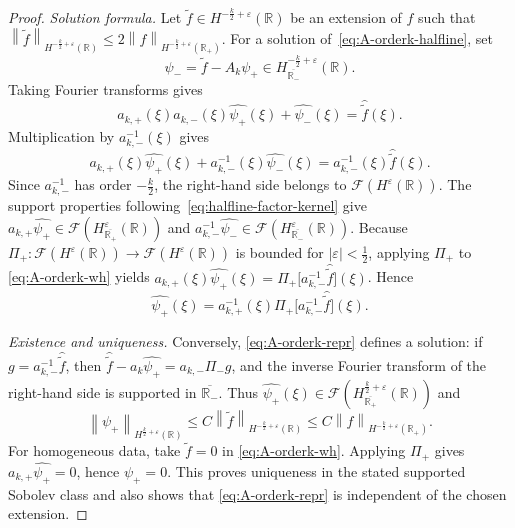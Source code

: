 \documentclass[11pt,reqno]{amsart}
\theoremstyle{plain}
\theoremstyle{definition}
\numberwithin{equation}{section}
\newcommand{\wh}[1]{\widehat{#1}}
\newcommand{\wt}[1]{\widetilde{#1}}
\newcommand{\norm}[1]{\left\lVert #1 \right\rVert}
\newcommand{\R}{\mathbb{R}}
\begin{document}
\begin{proof}
\emph{Solution formula.}
Let $\wt f\in H^{-\frac{k}{2}+\varepsilon}(\R)$ be an extension of $f$ such that
$\norm{\wt f}_{H^{-\frac{k}{2}+\varepsilon}(\R)}
\le 2 \norm{f}_{H^{-\frac{k}{2}+\varepsilon}(\R_+)}$.
For a solution of~\eqref{eq:A-orderk-halfline}, set
\begin{equation}
    \psi_-=\wt f-A_k\psi_+
    \in H^{-\frac{k}{2}+\varepsilon}_{\overline{\R_-}}(\R).
\end{equation}
Taking Fourier transforms gives
\begin{equation}
    a_{k,+}(\xi)a_{k,-}(\xi)\wh{\psi_+}(\xi) + \wh{\psi_-}(\xi)
    = \wh{\wt f}(\xi).
\end{equation}
Multiplication by $a_{k,-}^{-1}(\xi)$ gives
\begin{equation}\label{eq:A-orderk-wh}
    a_{k,+}(\xi)\wh{\psi_+}(\xi)
    + a_{k,-}^{-1}(\xi)\wh{\psi_-}(\xi)
    = a_{k,-}^{-1}(\xi)\wh{\wt f}(\xi).
\end{equation}
Since $a_{k,-}^{-1}$ has order $-\frac{k}{2}$, the right-hand side belongs to
$\mathcal{F}(H^\varepsilon(\R))$. The support properties following~\eqref{eq:halfline-factor-kernel} give
$a_{k,+}\wh{\psi_+}\in \mathcal{F}(H^\varepsilon_{\overline{\R_+}}(\R))$
and
$a_{k,-}^{-1}\wh{\psi_-}\in \mathcal{F}(H^\varepsilon_{\overline{\R_-}}(\R))$.
Because $\Pi_+:\mathcal{F}(H^\varepsilon(\R))\to\mathcal{F}(H^\varepsilon(\R))$
is bounded for $|\varepsilon|<\frac12$, applying $\Pi_+$ to
\eqref{eq:A-orderk-wh} yields
$a_{k,+}(\xi)\wh{\psi_+}(\xi)
= \Pi_+\!\bigl[a_{k,-}^{-1}\wh{\wt f}\bigr](\xi)$.
Hence
\begin{equation}\label{eq:A-orderk-repr}
    \wh{\psi_+}(\xi)
    = a_{k,+}^{-1}(\xi)\Pi_+\!\bigl[a_{k,-}^{-1}\wh{\wt f}\bigr](\xi).
\end{equation}

\emph{Existence and uniqueness.}
Conversely, \eqref{eq:A-orderk-repr} defines a solution: if
$g=a_{k,-}^{-1}\wh{\wt f}$, then
$\wh{\wt f}-a_k\wh{\psi_+}=a_{k,-}\Pi_-g$, and the inverse Fourier
transform of the right-hand side is supported in $\overline{\R_-}$.
Thus
$\wh{\psi_+}(\xi)\in
\mathcal{F}(H^{\frac{k}{2}+\varepsilon}_{\overline{\R_+}}(\R))$ and
\begin{equation}
    \norm{\psi_+}_{H^{\frac{k}{2}+\varepsilon}(\R)}
    \le C \norm{\wt f}_{H^{-\frac{k}{2}+\varepsilon}(\R)}
    \le C \norm{f}_{H^{-\frac{k}{2}+\varepsilon}(\R_+)}.
\end{equation}
For homogeneous data, take $\wt f=0$ in
\eqref{eq:A-orderk-wh}. Applying $\Pi_+$ gives
$a_{k,+}\wh{\psi_+}=0$, hence $\psi_+=0$. This proves uniqueness in
the stated supported Sobolev class and also shows that
\eqref{eq:A-orderk-repr} is independent of the chosen extension.


\end{proof}
\end{document}
